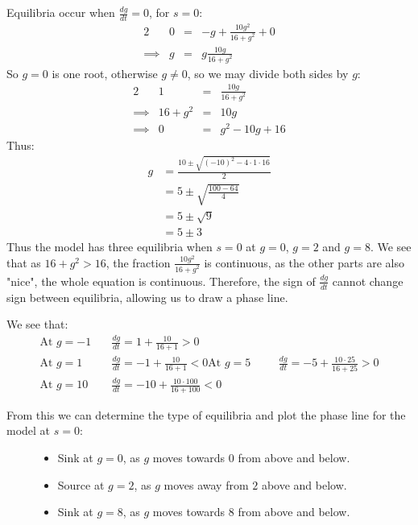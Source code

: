 \documentclass[a4paper, 11pt]{article}
\newcommand*{\TickSize}{0}%
\newcommand*{\AxisMin}{0}%
\newcommand*{\AxisMax}{0}%
\newcommand*{\DrawVerticalPhaseLine}[7][]{%
    \gdef\AxisMin{#5}%
    \gdef\AxisMax{#6}%
    \gdef\TickSize{#7}


    \edef\MyList{#2}%
    \foreach \X in \MyList {
      \draw  (-\TickSize,\X) -- (\TickSize,\X) node [right] {$#1\;=\X$};
    }

    \edef\MyList{#3}%
    \foreach \X in \MyList {%
      \draw [-{Latex[length=2mm, width=2mm]}] (0,\X-0.2) -- (0,\X);
    }

    \edef\MyList{#4}%
    \foreach \X in \MyList {%
      \draw [-{Latex[length=2mm, width=2mm]}] (0,\X+0.2) -- (0,\X);
    }

    \draw  (0,\AxisMin) -- (0,\AxisMax) node [above] {#1};
}%
\begin{document}
\begin{enumerate}[label=(\alph*)]
  Equilibria occur when $\frac{dg}{dt}=0$, for $s=0$: 
  \begin{alignat*}{2}
    & 0 &=& -g+\frac{10g^2}{16+g^2}+0  \\
    \implies & g &=& g\frac{10g}{16+g^2}  
  \end{alignat*}
  So $g=0$ is one root, otherwise $g\neq0$, so we may divide both sides by $g$: 
  \begin{alignat*}{2}
    & 1 &=& \frac{10g}{16+g^2}  \\
    \implies & 16+ g^2 &=& 10g\\
    \implies & 0 &=& g^2 - 10g + 16
  \end{alignat*}
  Thus: 
  \begin{align*}
    g &=\frac{10\pm\sqrt{(-10)^2-4\cdot 1\cdot16}}2\\
      &= 5\pm \sqrt{\frac{100-64}4}\\
      &= 5\pm \sqrt{9}\\
      &= 5\pm 3
  \end{align*}
  Thus the model has three equilibria when $s=0$ at $g=0$, $g=2$ and $g=8$. We see that as $16+g^2>16$, the fraction $\frac {10g^2}{16+g^2}$ is continuous, as the other parts are also "nice", the whole equation is continuous. Therefore, the sign of $\frac{dg}{dt}$ cannot change sign between equilibria, allowing us to draw a phase line.

  We see that: 
  \begin{align*}
    \text{At $g=-1$}\quad & \frac{dg}{dt}=  1+\frac{10}{16+1}>0\\
    \text{At $g=1$ }\quad & \frac{dg}{dt}= -1+\frac{10}{16+1}<0
    \text{At $g=5$ }\quad & \frac{dg}{dt}= -5+\frac{10\cdot 25}{16+25}>0\\
    \text{At $g=10$}\quad & \frac{dg}{dt}=-10+\frac{10\cdot100}{16+100}<0
  \end{align*}

  From this we can determine the type of equilibria and plot the phase line for the model at $s=0$:

  \begin{figure}[H]
    \centering
    \begin{minipage}[c]{0.2\textwidth}
    \end{minipage}%
    \begin{minipage}[c]{0.5\textwidth}
      \begin{itemize}
        \item Sink at $g=0$, as $g$ moves towards $0$ from above and below. 
        \item Source at $g=2$, as $g$ moves away from $2$ above and below. 
        \item Sink at $g=8$, as $g$ moves towards $8$ from above and below. 
      \end{itemize}
    \end{minipage}
 \end{figure}



\end{enumerate}
\end{document}
